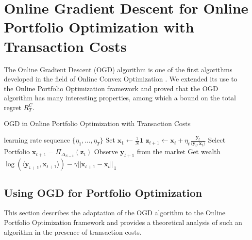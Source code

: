 \chapter{Online Gradient Descent for Online Portfolio Optimization with Transaction Costs}\label{ch:OGD}

The Online Gradient Descent (OGD) algorithm is one of the first algorithms developed in the field of Online Convex Optimization \cite{zinkevich2003online}. We extended its use to the Online Portfolio Optimization framework and proved that the OGD algorithm has many interesting properties, among which a bound on the total regret $R_T^C$.

\begin{algorithm}
    \caption{OGD in Online Portfolio Optimization with Transaction Costs}
    \label{alg:OGD_in_OPO}
    \begin{algorithmic}[1]
    \REQUIRE learning rate sequence $\{\eta_1, \ldots, \eta_T\}$  \nonumber
    \STATE Set $\mathbf{x}_1 \gets \frac{1}{N} \mathbf{1}$ \label{line:init_OGD}
    \STATE $\mathbf{z}_{t+1} \gets \mathbf{x}_{t}+ \eta_t \frac{\mathbf{y}_t}{\langle \mathbf{y}_t,\mathbf{x}_t \rangle}$ \label{line:update_OGD}
    \STATE Select Portfolio $\mathbf x_{t+1}=\Pi_{\Delta_{N-1}}(\mathbf z_t)$ \label{line:line_projection_OGD}
    \STATE Observe $\mathbf{y}_{t+1}$ from the market \label{line:out_OGD}
    \STATE Get wealth $\log( \langle \mathbf{y}_{t+1},\mathbf{x}_{t+1} \rangle) - \gamma|| \mathbf{x}_{t+1} - \mathbf{x}_{t} ||_1$ \label{line:wealth}
    \ENDFOR
    \end{algorithmic}
\end{algorithm}

\section{Using OGD for Portfolio Optimization} \label{sec:analysis}

This section describes the adaptation of the OGD algorithm to the Online Portfolio Optimization framework and provides a theoretical analysis of such an algorithm in the presence of transaction costs.


